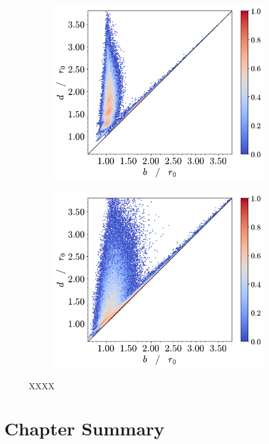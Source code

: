 \begin{figure}[tb]
\begin{subfigure}[b]{0.48\textwidth}
         \caption{}
         \label{fig:trpda}
     \end{subfigure}
     \hfill
        \begin{subfigure}[b]{0.48\textwidth}
         \centering
         \includegraphics[width=\textwidth]{./figures/ph/t199_bs_pd.pdf}
         \caption{}
         \label{fig:trpda}
     \end{subfigure}
     \hfill
      \begin{subfigure}[b]{0.48\textwidth}
         \centering
         \includegraphics[width=\textwidth]{./figures/ph/t0_bs_pd.pdf}
         \caption{}
         \label{fig:trpda}
     \end{subfigure}

     
  
    
	\caption{XXXX}
	\label{fig:}
\end{figure}

\section{Chapter Summary}